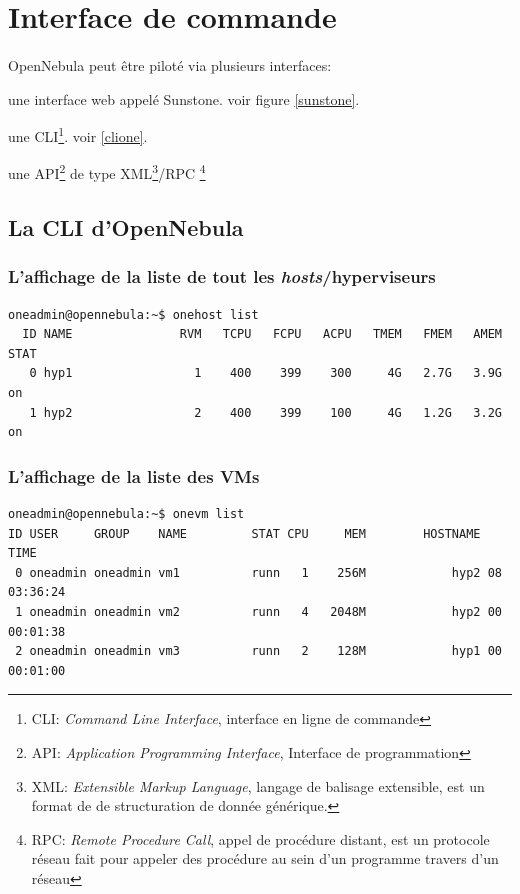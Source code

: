 \section{Interface de commande}
\paragraph*{}
OpenNebula peut être piloté via plusieurs interfaces:
\begin{listi}
	\item une interface web appelé Sunstone. voir figure \ref{sunstone}.
	\item une CLI\footnote{CLI: \emph{Command Line Interface}, interface en ligne de commande}. voir \ref{clione}.
	\item une API\footnote{API: \emph{Application Programming Interface}, Interface de programmation} de type
		XML\footnote{XML: \emph{Extensible Markup Language}, langage de balisage extensible, est un format de de structuration de donnée générique.}/RPC
		\footnote{RPC: \emph{Remote Procedure Call}, appel de procédure distant, est un protocole réseau fait pour appeler des procédure au sein d'un programme
		travers d'un réseau}
\end{listi}

\subsection{La CLI d'OpenNebula}
\label{onecli}

\subsubsection{L'affichage de la liste de tout les \emph{hosts}/hyperviseurs}
\begin{lstlisting}
oneadmin@opennebula:~$ onehost list
  ID NAME               RVM   TCPU   FCPU   ACPU   TMEM   FMEM   AMEM   STAT
   0 hyp1                 1    400    399    300     4G   2.7G   3.9G     on
   1 hyp2                 2    400    399    100     4G   1.2G   3.2G     on
\end{lstlisting}

\subsubsection{L'affichage de la liste des VMs}
\begin{lstlisting}
oneadmin@opennebula:~$ onevm list
ID USER     GROUP    NAME         STAT CPU     MEM        HOSTNAME        TIME
 0 oneadmin oneadmin vm1          runn   1    256M            hyp2 08 03:36:24
 1 oneadmin oneadmin vm2          runn   4   2048M            hyp2 00 00:01:38
 2 oneadmin oneadmin vm3          runn   2    128M            hyp1 00 00:01:00
\end{lstlisting}

